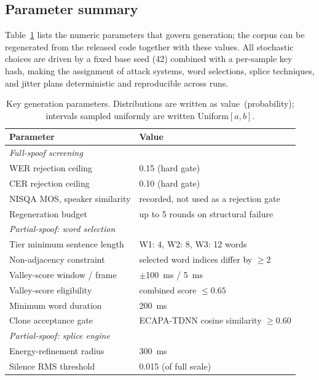 \documentclass[11pt]{article}
\begin{document}
\subsection*{Parameter summary}

Table~\ref{tab:params} lists the numeric parameters that govern
generation; the corpus can be regenerated from the released code
together with these values. All stochastic choices are driven by a
fixed base seed (42) combined with a per-sample key hash, making the
assignment of attack systems, word selections, splice techniques, and
jitter plans deterministic and reproducible across runs.

\begin{table}[t]
\centering
\caption{Key generation parameters. Distributions are written as
value~(probability); intervals sampled uniformly are written
Uniform$[a,b]$.}
\label{tab:params}
\small
\begin{tabular}{p{4.9cm}p{6.6cm}}
\toprule
\textbf{Parameter} & \textbf{Value} \\
\midrule
\multicolumn{2}{l}{\emph{Full-spoof screening}} \\
\midrule
WER rejection ceiling & 0.15 (hard gate) \\
CER rejection ceiling & 0.10 (hard gate) \\
NISQA MOS, speaker similarity & recorded, not used as a rejection gate \\
Regeneration budget & up to 5 rounds on structural failure \\
\midrule
\multicolumn{2}{l}{\emph{Partial-spoof: word selection}} \\
\midrule
Tier minimum sentence length & W1: 4, W2: 8, W3: 12 words \\
Non-adjacency constraint & selected word indices differ by $\geq 2$ \\
Valley-score window / frame & $\pm$\SI{100}{\milli\second} / \SI{5}{\milli\second} \\
Valley-score eligibility & combined score $\leq 0.65$ \\
Minimum word duration & \SI{200}{\milli\second} \\
Clone acceptance gate & ECAPA-TDNN cosine similarity $\geq 0.60$ \\
\midrule
\multicolumn{2}{l}{\emph{Partial-spoof: splice engine}} \\
\midrule
Energy-refinement radius & \SI{300}{\milli\second} \\
Silence RMS threshold & 0.015 (of full scale) \\

\end{tabular}
\end{table}
\end{document}
